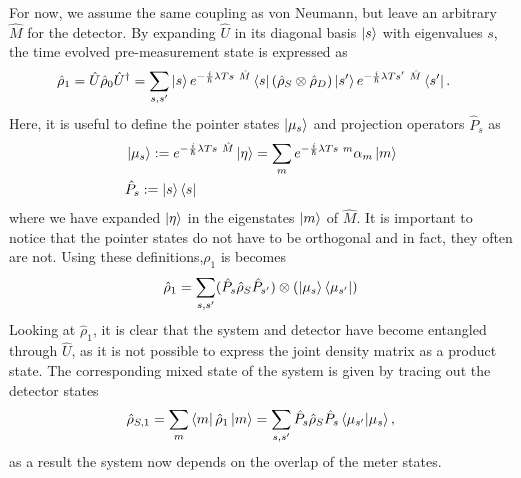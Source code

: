\documentclass{article}
\begin{document}
For now, we assume the same coupling as von Neumann, but leave an arbitrary $\hat{M}$ for the detector. By expanding
$\hat{U}$ in its diagonal basis $\ket{s}$ with eigenvalues $s$, the time evolved pre-measurement state is expressed as
\begin{align*}
  \hat{\rho}_1 = \hat{U}\hat{\rho}_0 \hat{U}^\dagger & =  \sum_{s,s^\prime} \ket{s} e^{-\frac{i}{\hbar} \lambda T s \hat{M} } \bra{s}
  \left (  \hat{\rho}_S \otimes \hat{\rho}_D \right ) \ket{s^\prime} e^{-\frac{i}{\hbar} \lambda 
    T s^\prime \hat{M} } \bra{s^\prime}.
\end{align*}
Here, it is useful to define the pointer states $\ket{\mu_s}$ and projection operators $\hat{P}_s$ as
\begin{align}
    & \ket{\mu_s} := e^{-\frac{i}{\hbar} \lambda T s \hat{M} } \ket{\eta} = \sum_m  e^{-\frac{i}{\hbar} \lambda T s m } 
    \alpha_m \ket{m} \\
    & \hat{P}_s := \ket{s} \bra{s}
\end{align}
where we have expanded $\ket{\eta}$ in the eigenstates $\ket{m}$ of $\hat{M}$. It is important to notice that the pointer states do not have to
be orthogonal and in fact, they often are not. Using these definitions,$\rho_1$ is becomes
\begin{align}\label{eq:pre_measurement}
    \hat{\rho}_1 = \sum_{s,s^\prime} ( \hat{P}_s \hat{\rho}_S \hat{P}_{s^\prime} ) \otimes 
    (\ket{\mu_s}\bra{\mu_{s^\prime}})
\end{align}
Looking at $\hat{\rho}_1$, it is clear that the system and detector have become entangled through $\hat{U}$, as
it is not possible to express the joint density matrix as a product state. The corresponding mixed state of the system
is given by tracing out the detector states
\begin{align}\label{eq:pre_measurement_system_full}
    \hat{\rho}_{S,1} =  \sum_m \bra{m}\hat{\rho}_{1}\ket{m} = \sum_{s,s^\prime} \hat{P}_s \hat{\rho}_{S} \hat{P}_s
    \bra{\mu_{s^\prime}} \ket{\mu_s},
\end{align}
as a result the system now depends on the overlap of the meter states. 
\end{document}
